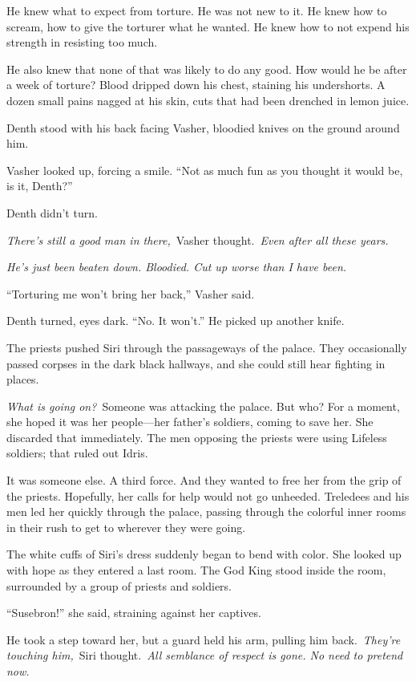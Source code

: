 He knew what to expect from torture. He was not new to it. He knew how to scream, how to give the torturer what he wanted. He knew how to not expend his strength in resisting too much.

He also knew that none of that was likely to do any good. How would he be after a week of torture? Blood dripped down his chest, staining his undershorts. A dozen small pains nagged at his skin, cuts that had been drenched in lemon juice.

Denth stood with his back facing Vasher, bloodied knives on the ground around him.

Vasher looked up, forcing a smile. “Not as much fun as you thought it would be, is it, Denth?”

Denth didn’t turn.

\textit{There’s still a good man in there,}~Vasher thought.~\textit{Even after all these years.}

\textit{He’s just been beaten down. Bloodied. Cut up worse than I have been.}

“Torturing me won’t bring her back,” Vasher said.

Denth turned, eyes dark. “No. It won’t.” He picked up another knife.

\orn

The priests pushed Siri through the passageways of the palace. They occasionally passed corpses in the dark black hallways, and she could still hear fighting in places.

\textit{What is going on?}~Someone was attacking the palace. But who? For a moment, she hoped it was her people—her father’s soldiers, coming to save her. She discarded that immediately. The men opposing the priests were using Lifeless soldiers; that ruled out Idris.

It was someone else. A third force. And they wanted to free her from the grip of the priests. Hopefully, her calls for help would not go unheeded. Treledees and his men led her quickly through the palace, passing through the colorful inner rooms in their rush to get to wherever they were going.

The white cuffs of Siri’s dress suddenly began to bend with color. She looked up with hope as they entered a last room. The God King stood inside the room, surrounded by a group of priests and soldiers.

“Susebron!” she said, straining against her captives.

He took a step toward her, but a guard held his arm, pulling him back.~\textit{They’re touching him,}~Siri thought.~\textit{All semblance of respect is gone. No need to pretend now.}

